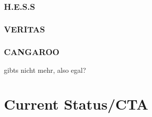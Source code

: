 \subsubsection{H.E.S.S}

\subsubsection{VERITAS}

\subsubsection{CANGAROO}
gibts nicht mehr, also egal?



\section{Current Status/CTA}


